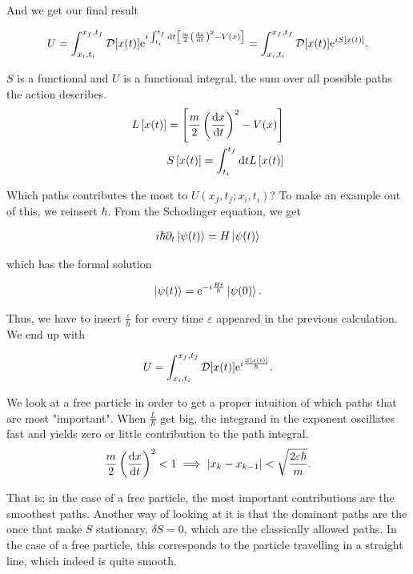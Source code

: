 And we get our final result 

\begin{equation}
    U = \int_{x_{i}, t_{i}}^{x_{f},t{_f}} \mathcal{D}[x(t)] \mathrm{e}^{i\int_{t_{i}}^{t_{f}} \dd t \left[ \frac{m}{2}\left(\dv{x}{t}\right)^{2} - V(x) \right]} = \int_{x_{i}, t_{i}}^{x_{f},t{_f}} \mathcal{D}[x(t)] \mathrm{e}^{iS\left[x(t)\right]}. 
\end{equation}

$S$ is a functional and $U$ is a functional integral, the sum over all possible paths the action describes. \\ 

\begin{align*}
    L\left[x(t)\right] = \left[ \frac{m}{2}\left(\dv{x}{t}\right)^{2} - V(x) \right] \\ 
    S\left[x(t)\right] = \int_{t_{i}}^{t_{f}} \dd t L\left[x(t)\right]
\end{align*}

Which paths contributes the most to $U(x_{f}, t_{f} ; x_{i}, t_{i})$? To make an example out of this, we reinsert $\hbar$. From the Schodinger equation, we get 

\begin{align*}
    i\hbar \partial_{t} \ket{\psi(t)} = H\ket{\psi(t)}
\end{align*}

which has the formal solution 

\begin{align*}
    \ket{\psi(t)} = \mathrm{e}^{-i\frac{Ht}{\hbar}}\ket{\psi(0)}.
\end{align*}

Thus, we have to insert $\frac{\varepsilon}{\hbar}$ for every time $\varepsilon$ appeared in the previous calculation. We end up with 

\begin{align*}
    U = \int_{x_{i}, t_{i}}^{x_{f},t{_f}} \mathcal{D}[x(t)] \mathrm{e}^{i\frac{S\left[x(t)\right]}{\hbar}}.
\end{align*}

We look at a free particle in order to get a proper intuition of which paths that are most "important". When $\frac{L}{\hbar}$ get big, the integrand in the exponent oscillates fast and yields zero or little contribution to the path integral. 
\begin{equation*}
    \frac{m}{2}\left(\dv{x}{t}\right)^{2} < 1 \implies \abs{x_{k} - x_{k-1}} < \sqrt{\frac{2\varepsilon \hbar}{m}}.
\end{equation*}

That is: in the case of a free particle, the most important contributions are the smoothest paths. Another way of looking at it is that the dominant paths are the once that make $S$ stationary, $\delta S = 0$, which are the classically allowed paths. In the case of a free particle, this corresponds to the particle travelling in a straight line, which indeed is quite smooth. 


